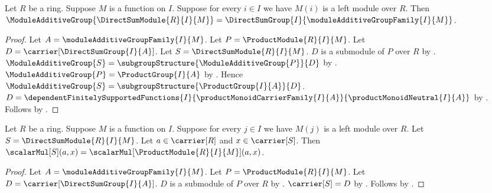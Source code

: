 \begin{theorem}\label{direct_sum_module_additive_group_exact}
    Let $R$ be a ring.
    Suppose $M$ is a function on $I$.
    Suppose for every $i\in I$ we have $M(i)$ is a left module over $R$.
    Then
        $\ModuleAdditiveGroup{\DirectSumModule{R}{I}{M}}
            =\DirectSumGroup{I}{\moduleAdditiveGroupFamily{I}{M}}$.
\end{theorem}
\begin{proof}
    Let $A=\moduleAdditiveGroupFamily{I}{M}$.
    Let $P=\ProductModule{R}{I}{M}$.
    Let $D=\carrier[\DirectSumGroup{I}{A}]$.
    Let $S=\DirectSumModule{R}{I}{M}$.
    $D$ is a submodule of $P$ over $R$ by
        .
    $\ModuleAdditiveGroup{S}
        =\subgroupStructure{\ModuleAdditiveGroup{P}}{D}$ by
        .
    $\ModuleAdditiveGroup{P}=\ProductGroup{I}{A}$ by
        .
    Hence $\ModuleAdditiveGroup{S}
        =\subgroupStructure{\ProductGroup{I}{A}}{D}$.
    $D=\dependentFinitelySupportedFunctions{I}{
        \productMonoidCarrierFamily{I}{A}}{
        \productMonoidNeutral{I}{A}}$ by
        .
    Follows by .
\end{proof}

\begin{proposition}\label{direct_sum_module_scalar_apply}
    Let $R$ be a ring.
    Suppose $M$ is a function on $I$.
    Suppose for every $j\in I$ we have $M(j)$ is a left module over $R$.
    Let $S=\DirectSumModule{R}{I}{M}$.
    Let $a\in\carrier[R]$ and $x\in\carrier[S]$.
    Then
        $\scalarMul[S](a,x)
            =\scalarMul[\ProductModule{R}{I}{M}](a,x)$.
\end{proposition}
\begin{proof}
    Let $A=\moduleAdditiveGroupFamily{I}{M}$.
    Let $P=\ProductModule{R}{I}{M}$.
    Let $D=\carrier[\DirectSumGroup{I}{A}]$.
    $D$ is a submodule of $P$ over $R$ by
        .
    $\carrier[S]=D$ by .
    Follows by
        .
\end{proof}


